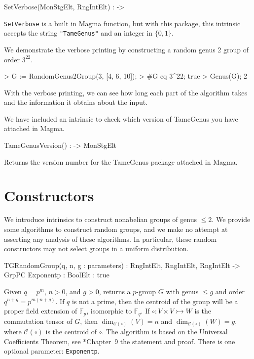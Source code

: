\documentclass{documentation}
\begin{document}
\begin{intrinsics}
SetVerbose(MonStgElt, RngIntElt) : -> 
\end{intrinsics}

{\tt SetVerbose} is a built in Magma function, but with this package, this intrinsic accepts the string {\tt "TameGenus"} and an integer in $\{0,1\}$. 

\begin{example}[VerbosePrinting]
  We demonstrate the verbose printing by constructing a random genus 2 group of order $3^{22}$.

\begin{code}
> G := RandomGenus2Group(3, [4, 6, 10]);
> #G eq 3^22;
true
> Genus(G);
2
\end{code}

With the verbose printing, we can see how long each part of the algorithm takes and the information it obtains about the input.
\begin{code}

\end{code}
\end{example}

We have included an intrinsic to check which version of TameGenus you have attached in Magma.

\begin{intrinsics}
TameGenusVersion() : -> MonStgElt
\end{intrinsics}

Returns the version number for the TameGenus package attached in Magma.


\chapter{Constructors}

We introduce intrinsics to construct nonabelian groups of genus $\leq 2$. 
We provide some algorithms to construct random groups, and we make no attempt at asserting any analysis of these algorithms.
In particular, these random constructors may not select groups in a uniform distribution. 

\begin{intrinsics}
TGRandomGroup(q, n, g : parameters) : RngIntElt, RngIntElt, RngIntElt -> GrpPC
    Exponentp : BoolElt : true
\end{intrinsics}

Given $q=p^m$, $n>0$, and $g>0$, returns a $p$-group $G$ with genus $\leq g$ and order $q^{n+g}=p^{m(n+g)}$. 
If $q$ is not a prime, then the centroid of the group will be a proper field extension of $\mathbb{F}_p$, isomorphic to $\mathbb{F}_q$. 
If $\circ: V\times V\rightarrowtail W$ is the commutation tensor of $G$, then $\dim_{\mathcal{C}(\circ)}(V)=n$ and $\dim_{\mathcal{C}(\circ)}(W)=g$, where $\mathcal{C}(\circ)$ is the centroid of $\circ$. 
The algorithm is based on the Universal Coefficients Theorem, see \cite{LGM:book}*{Chapter~9} the statement and proof.
There is one optional parameter: {\tt Exponentp}. 
\end{document}
